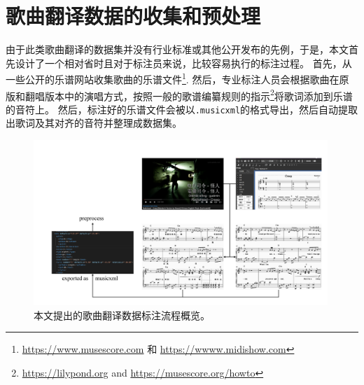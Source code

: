 \section{歌曲翻译数据的收集和预处理}
由于此类歌曲翻译的数据集并没有行业标准或其他公开发布的先例，于是，本文首先设计了一个相对省时且对于标注员来说，比较容易执行的标注过程。
首先，从一些公开的乐谱网站收集歌曲的乐谱文件\footnote{\url{https://www.musescore.com} 和 \url{https://wwww.midishow.com}}.
然后，专业标注人员会根据歌曲在原版和翻唱版本中的演唱方式，按照一般的歌谱编纂规则的指示\footnote{\url{https://lilypond.org} and \url{https://musescore.org/howto}}将歌词添加到乐谱的音符上。
然后，标注好的乐谱文件会被以\texttt{.musicxml}的格式导出，然后自动提取出歌词及其对齐的音符并整理成数据集。
\begin{figure}[t]
    \centering
    \includegraphics[width=0.99\textwidth]{figure/ast/da_pipeline}
    \caption{本文提出的歌曲翻译数据标注流程概览。}
    \label{fig:da_pipeline}
\end{figure}
